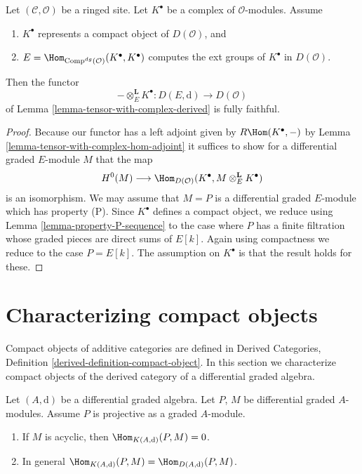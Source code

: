 \begin{lemma}
\label{lemma-fully-faithful-in-compact-case}
Let $(\mathcal{C}, \mathcal{O})$ be a ringed site.
Let $K^\bullet$ be a complex of $\mathcal{O}$-modules.
Assume
\begin{enumerate}
\item $K^\bullet$ represents a compact object of $D(\mathcal{O})$, and
\item $E = \Hom_{\text{Comp}^{dg}(\mathcal{O})}(K^\bullet, K^\bullet)$
computes the ext groups of $K^\bullet$ in $D(\mathcal{O})$.
\end{enumerate}
Then the functor
$$
- \otimes_E^\mathbf{L} K^\bullet :
D(E, \text{d})
\longrightarrow
D(\mathcal{O})
$$
of Lemma \ref{lemma-tensor-with-complex-derived} is fully faithful.
\end{lemma}

\begin{proof}
Because our functor has a left adjoint given by
$R\Hom(K^\bullet, -)$ by Lemma \ref{lemma-tensor-with-complex-hom-adjoint}
it suffices to show for a differential graded $E$-module $M$ that the map
$$
H^0(M) \longrightarrow
\Hom_{D(\mathcal{O})}(K^\bullet, M \otimes_E^\mathbf{L} K^\bullet)
$$
is an isomorphism. We may assume that $M = P$ is a differential graded
$E$-module which has property (P). Since $K^\bullet$ defines a
compact object, we reduce using
Lemma \ref{lemma-property-P-sequence}
to the case where $P$ has a finite filtration whose graded pieces
are direct sums of $E[k]$. Again using compactness we reduce
to the case $P = E[k]$. The assumption on $K^\bullet$ is that
the result holds for these.
\end{proof}











\section{Characterizing compact objects}
\label{section-compact}

\noindent
Compact objects of additive categories are defined in
Derived Categories, Definition \ref{derived-definition-compact-object}.
In this section we characterize compact objects of the derived
category of a differential graded algebra.

\begin{lemma}
\label{lemma-source-graded-projective}
Let $(A, \text{d})$ be a differential graded algebra.
Let $P$, $M$ be differential graded $A$-modules.
Assume $P$ is projective as a graded $A$-module.
\begin{enumerate}
\item If $M$ is acyclic, then $\Hom_{K(A, \text{d})}(P, M) = 0$.
\item In general $\Hom_{K(A, \text{d})}(P, M) = \Hom_{D(A, \text{d})}(P, M)$.
\end{enumerate}
\end{lemma}

